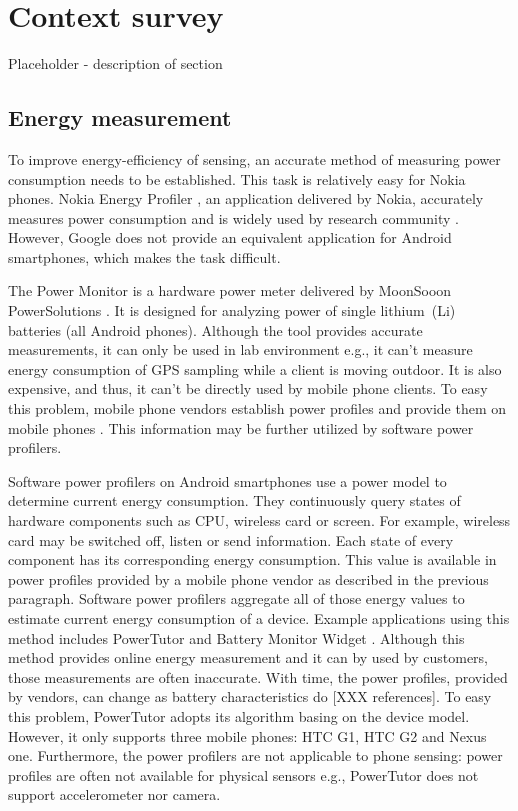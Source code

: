 \section{Context survey}
\label{s:contextsurvey}
Placeholder - description of section\\
\subsection{Energy measurement}
\hspace{10pt} To improve energy-efficiency of sensing, an accurate method of measuring power consumption needs to be established. This task is relatively easy for Nokia phones. Nokia Energy Profiler \cite{nokia:profiler}, an application delivered by Nokia,  accurately measures power consumption and is widely used by research community \cite{kjaergaard:entracked} \cite{lu:jigsaw} \cite{li:status}. However, Google does not provide an equivalent application for Android smartphones, which makes the task difficult.

The Power Monitor is a hardware power meter delivered by MoonSooon PowerSolutions \cite{monsoon:powermonitor}.  It is designed for analyzing power of single lithium\ (Li) batteries (all Android phones). Although the tool provides accurate measurements, it can only be used in lab environment e.g., it can't measure energy consumption of GPS sampling while a client is moving outdoor. It is also expensive, and thus, it can't be directly used by mobile phone clients. To easy this problem, mobile phone vendors establish power profiles and provide them on mobile phones \cite{android:powerprofiles}. This information may be further utilized by software power profilers.

Software power profilers on Android smartphones use a power model to determine current energy consumption. They continuously query states of hardware components such as CPU, wireless card or screen. For example, wireless card may be switched off, listen or send information. Each state of every component has its corresponding energy consumption. This value is available in power profiles provided by a mobile phone vendor as described in the previous paragraph. Software power profilers aggregate all of those energy values to estimate current energy consumption of a device. Example applications using this method includes PowerTutor \cite{zhang:powertutor} and Battery Monitor Widget \cite{googleplay:batterymonitorwidget}. Although this method provides online energy measurement and it can by used by customers, those measurements are often inaccurate. With time, the power profiles, provided by vendors, can change as battery characteristics do [XXX references]. To easy this problem, PowerTutor adopts its algorithm basing on the device model. However, it only supports three mobile phones: HTC G1, HTC G2 and Nexus one. Furthermore, the power profilers are not applicable to phone sensing: power profiles are often not available for physical sensors e.g., PowerTutor does not support accelerometer nor camera.

